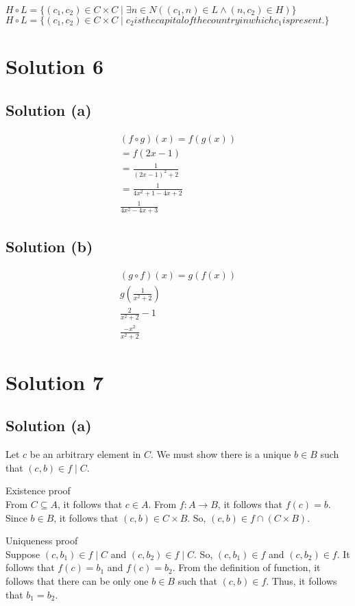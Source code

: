 \documentclass{article}
\begin{document}
$H \circ L = \{(c_1, c_2) \in C \times C \mid \exists n \in N((c_1, n)
\in L \land (n, c_2) \in H)\}$ \\
$H \circ L = \{(c_1,c_2) \in C \times C \mid c_2 is the
capital of the country in which c_1 is present. \}$

\section{Solution 6}
\subsection{Solution (a)}
\begin{align*}
  (f \circ g)(x) = f(g(x)) \\
  = f(2x - 1) \\
  = \frac{1}{(2x - 1)^2 + 2} \\
  = \frac{1}{4x^2 + 1 - 4x + 2} \\
  \frac{1}{4x^2 - 4x + 3} 
\end{align*}
\subsection{Solution (b)}
\begin{align*}
  (g \circ f)(x) = g(f(x)) \\
  g(\frac{1}{x^2 + 2}) \\
  \frac{2}{x^2 + 2} - 1 \\
  \frac{-x^2}{x^2 + 2}
\end{align*}

\section{Solution 7}
\subsection{Solution (a)}
Let $c$ be an arbitrary element in $C$. We must show there is a unique
$b \in B$ such that $(c,b) \in f \mid C$.

Existence proof \\
From $C \subseteq A$, it follows that $c \in A$. From $f : A \to B $,
it follows that $f(c) = b$. Since $b \in B$, it follows that $(c,b)
\in C \times B$. So, $(c,b) \in f \cap (C \times B)$.

Uniqueness proof \\
Suppose $(c,b_1) \in f \mid C$ and $(c,b_2) \in f \mid C$. So,
$(c,b_1) \in f$ and $(c,b_2) \in f$. It follows that $f(c) = b_1$ and
$f(c) = b_2$. From the definition of function, it follows that there
can be only one $b \in B$ such that $(c,b) \in f$. Thus, it follows
that $b_1 = b_2$.
\end{document}
